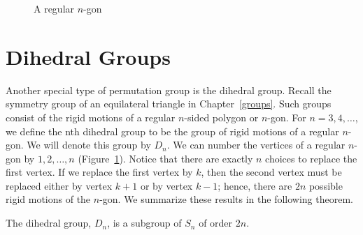 \medskip
 
\begin{figure}[hbt] %
\begin{center}

\end{center}
\caption{A regular $n$-gon}
\label{regular}
\end{figure}
 

\section{Dihedral Groups}
 

Another special type of permutation group is the dihedral group. 
Recall the symmetry group of an equilateral triangle in Chapter~\ref{groups}. 
Such groups consist of the  rigid motions of a regular $n$-sided 
polygon or $n$-gon. For $n = 3, 4, \ldots$, we define the {\bfi 
nth dihedral group\/} to be the group of 
rigid motions of a regular $n$-gon.  We will denote this group by
$D_n$\label{dihedralgroup}.  We can number the vertices of a regular
$n$-gon by $1, 2, \ldots, n$ (Figure~\ref{regular}).  Notice that
there are exactly $n$ choices to replace the first vertex.  If we
replace the first vertex by $k$, then the second vertex must be replaced
either by vertex $k+1$ or by vertex $k-1$; hence, there are $2n$
possible rigid motions of the $n$-gon.  We summarize these results in
the following theorem.  

 
\begin{theorem}
The dihedral group, $D_n$, is a subgroup of $S_n$ of order $2n$.
\end{theorem}
 

